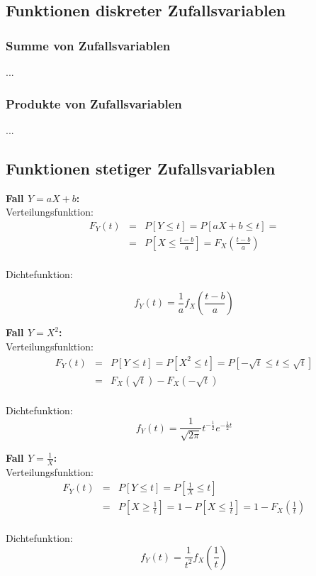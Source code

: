 \documentclass[10pt,a4paper,twocolumn]{article}
\begin{document}
\subsection{Funktionen diskreter Zufallsvariablen}

\subsubsection{Summe von Zufallsvariablen}
...

\subsubsection{Produkte von Zufallsvariablen}
...

\subsection{Funktionen stetiger Zufallsvariablen}
\textbf{Fall \boldmath$Y=aX+b$:} \\
Verteilungsfunktion:
\[
\begin{array}{rcl}
	F_Y(t) & = & P[Y\leq t]=P[aX+b\leq t]= \\
	& = & P[X\leq \frac{t-b}{a}]=F_X(\frac{t-b}{a}) \\
\end{array}
\]

Dichtefunktion:

\[
f_Y(t)=\frac{1}{a}f_X\left(\frac{t-b}{a}\right)
\]

\textbf{Fall \boldmath$Y=X^2$:} \\
Verteilungsfunktion:
\[
\begin{array}{rcl}
	F_Y(t) & = & P[Y\leq t]=P[X^2\leq t]=P[-\sqrt{t}\leq t\leq\sqrt{t}] \\
	& = & F_X(\sqrt{t})-F_X(-\sqrt{t}) \\
\end{array}
\]

Dichtefunktion:
\[
f_Y(t)=\frac{1}{\sqrt{2\pi}}t^{-\frac{1}{2}}e^{-\frac{1}{2}t}
\]

\textbf{Fall \boldmath$Y=\frac{1}{X}$:} \\
Verteilungsfunktion:
\[
\begin{array}{rcl}
	F_Y(t) & = & P[Y\leq t]=P[\frac{1}{X}\leq t] \\
	& = & P[X\geq\frac{1}{t}]=1-P[X\leq\frac{1}{t}]=1-F_X(\frac{1}{t}) \\
\end{array}
\]

Dichtefunktion:
\[
f_Y(t)=\frac{1}{t^2}f_X\left(\frac{1}{t}\right)
\]
\end{document}
